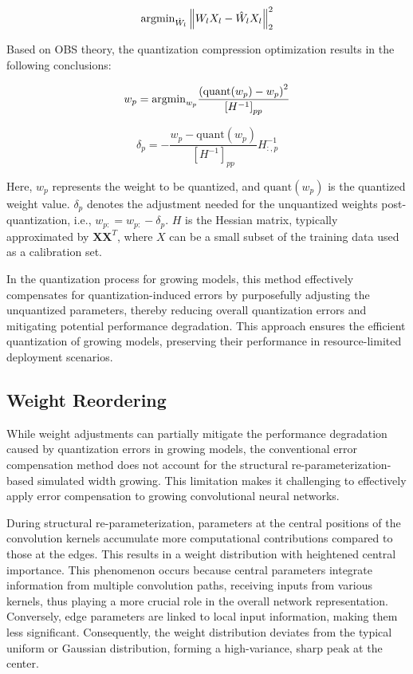 \documentclass[preprint,12pt]{elsarticle}
\begin{document}
\begin{equation}
{\rm argmin}_{\hat{W}_l} \left\| W_lX_l - \hat{W}_lX_l \right\|_2^2
\end{equation}

Based on OBS theory, the quantization compression optimization results in the following conclusions:

\begin{equation}
w_p = {\rm argmin}_{w_p} \frac{\left(\mathrm{quant}(w_p) - w_p\right)^2}{\left[H^{-1}\right]_{pp}}
\end{equation}

\begin{equation}
\delta_p = -\frac{w_p - \mathrm{quant}(w_p)}{\left[H^{-1}\right]_{pp}} H_{:,p}^{-1}
\end{equation}


Here, \(w_p\) represents the weight to be quantized, and \(\mathrm{quant}(w_p)\) is the quantized weight value. \(\delta_p\) denotes the adjustment needed for the unquantized weights post-quantization, i.e., \(w_{p:} = w_{p:} - \delta_p\). \(H\) is the Hessian matrix, typically approximated by \(\mathbf{XX}^T\), where \(X\) can be a small subset of the training data used as a calibration set.

In the quantization process for growing models, this method effectively compensates for quantization-induced errors by purposefully adjusting the unquantized parameters, thereby reducing overall quantization errors and mitigating potential performance degradation. This approach ensures the efficient quantization of growing models, preserving their performance in resource-limited deployment scenarios.

\subsection{Weight Reordering}

While weight adjustments can partially mitigate the performance degradation caused by quantization errors in growing models, the conventional error compensation method does not account for the structural re-parameterization-based simulated width growing. This limitation makes it challenging to effectively apply error compensation to growing convolutional neural networks.

During structural re-parameterization, parameters at the central positions of the convolution kernels accumulate more computational contributions compared to those at the edges. This results in a weight distribution with heightened central importance. This phenomenon occurs because central parameters integrate information from multiple convolution paths, receiving inputs from various kernels, thus playing a more crucial role in the overall network representation. Conversely, edge parameters are linked to local input information, making them less significant. Consequently, the weight distribution deviates from the typical uniform or Gaussian distribution, forming a high-variance, sharp peak at the center.
\end{document}
